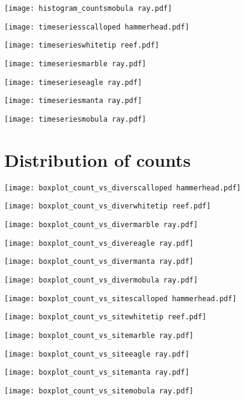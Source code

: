 \documentclass[a4paper]{article}
\begin{document}
\texttt{[image: histogram\_countsmobula ray.pdf]}%

\texttt{[image: timeseriesscalloped hammerhead.pdf]}

\texttt{[image: timeserieswhitetip reef.pdf]}

\texttt{[image: timeseriesmarble ray.pdf]}

\texttt{[image: timeserieseagle ray.pdf]}

\texttt{[image: timeseriesmanta ray.pdf]}

\texttt{[image: timeseriesmobula ray.pdf]}




\clearpage



\section{Distribution of counts}


\texttt{[image: boxplot\_count\_vs\_diverscalloped hammerhead.pdf]}

\texttt{[image: boxplot\_count\_vs\_diverwhitetip reef.pdf]}

\texttt{[image: boxplot\_count\_vs\_divermarble ray.pdf]}

\texttt{[image: boxplot\_count\_vs\_divereagle ray.pdf]}

\texttt{[image: boxplot\_count\_vs\_divermanta ray.pdf]}

\texttt{[image: boxplot\_count\_vs\_divermobula ray.pdf]}


\texttt{[image: boxplot\_count\_vs\_sitescalloped hammerhead.pdf]}

\texttt{[image: boxplot\_count\_vs\_sitewhitetip reef.pdf]}

\texttt{[image: boxplot\_count\_vs\_sitemarble ray.pdf]}

\texttt{[image: boxplot\_count\_vs\_siteeagle ray.pdf]}

\texttt{[image: boxplot\_count\_vs\_sitemanta ray.pdf]}

\texttt{[image: boxplot\_count\_vs\_sitemobula ray.pdf]}
\end{document}
